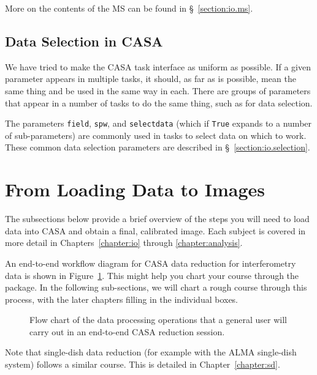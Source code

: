 More on the contents of the MS can be found in \S~\ref{section:io.ms}.

\subsection{Data Selection in CASA}
\label{section:intro.common.selection}

We have tried to make the CASA task interface as uniform as possible.
If a given parameter appears in multiple tasks, it should, as far as
is possible, mean the same thing and be used in the same way in each.
There are groups of parameters that appear in a number of tasks to
do the same thing, such as for data selection.

The parameters {\tt field}, {\tt spw}, and {\tt selectdata} (which if
{\tt True} expands to a number of sub-parameters) are commonly used in
tasks to select data on which to work.  These common data selection
parameters are described in \S~\ref{section:io.selection}.


\section{From Loading Data to Images}
\label{section:intro.walkthru}

The subsections below provide a brief overview of the steps you will
need to load data into CASA and obtain a final, calibrated image.
Each subject is covered in more detail in Chapters~\ref{chapter:io}
through \ref{chapter:analysis}.

An end-to-end workflow diagram for CASA data reduction for
interferometry data is shown in Figure~\ref{fig:casaflow}.  
This might help you chart your course through the package.
In the following sub-sections, we will chart a rough course through
this process, with the later chapters filling in the individual
boxes.

\begin{figure}[h!]
\caption{\label{fig:casaflow}
Flow chart of the data processing operations that a general 
user will carry out in an end-to-end CASA reduction session.}
\hrulefill
\end{figure}

Note that single-dish data reduction (for example with the ALMA
single-dish system) follows a similar course.  This is detailed
in Chapter~\ref{chapter:sd}.

